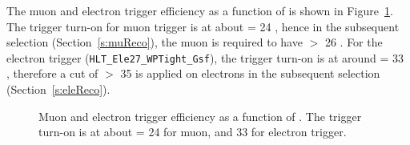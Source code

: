 \begin{itemize} [leftmargin=*]
The muon and electron trigger efficiency as a function of \pt is shown 
in Figure~\ref{fig:trigEff}. The trigger turn-on for muon trigger is 
at about \pt = 24 \GeV, hence in the subsequent selection (Section~\ref{s:muReco}),
the muon is required to have \pt $>$ 26 \GeV. For the electron trigger 
(\verb|HLT_Ele27_WPTight_Gsf|), the trigger turn-on is at around 
\pt = 33 \GeV, therefore a cut of \pt $>$ 35 \GeV is applied on 
electrons in the subsequent selection (Section~\ref{s:eleReco}).
\begin{figure}
\centering
{}
\vfil
{}
\caption{Muon and electron trigger efficiency as a function of \pt. 
The trigger turn-on is at about \pt = 24 \GeV for muon, and 33 \GeV for electron trigger.}
\label{fig:trigEff}
\end{figure}
\end{itemize}

